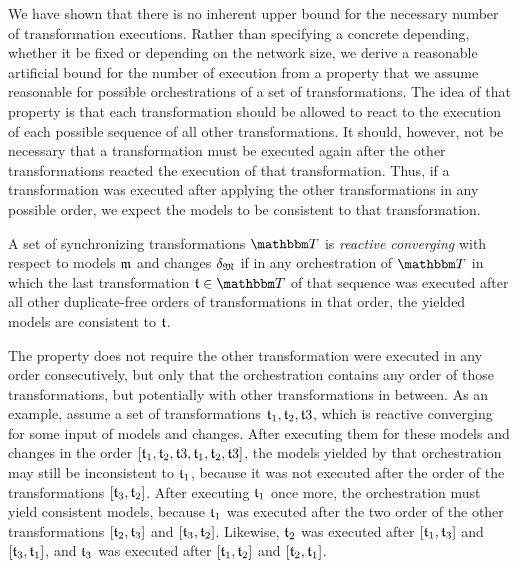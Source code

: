 We have shown that there is no inherent upper bound for the necessary number of transformation executions.
Rather than specifying a concrete depending, whether it be fixed or depending on the network size, we derive a reasonable artificial bound for the number of execution from a property that we assume reasonable for possible orchestrations of a set of transformations.
The idea of that property is that each transformation should be allowed to react to the execution of each possible sequence of all other transformations.
It should, however, not be necessary that a transformation must be executed again after the other transformations reacted the execution of that transformation.
Thus, if a transformation was executed after applying the other transformations in any possible order, we expect the models to be consistent to that transformation.

\begin{definition}
    \label{def:reactiveconverging}
    A set of synchronizing transformations $\transformationset{T}$ is \emph{reactive converging} with respect to models $\mathfrak{m}$ and changes $\mathfrak{\delta}_{\mathfrak{M}}$ if in any orchestration of $\transformationset{T}$ in which the last transformation $\transformation{t} \in \transformationset{T}$ of that sequence was executed after all other duplicate-free orders of transformations in that order, the yielded models are consistent to $\mathfrak{t}$.
\end{definition}

The property does not require the other transformation were executed in any order consecutively, but only that the orchestration contains any order of those transformations, but potentially with other transformations in between.
As an example, assume a set of transformations $\mathfrak{t}_{1}, \mathfrak{t}_{2}, \mathfrak{t}{3}$, which is reactive converging for some input of models and changes.
After executing them for these models and changes in the order $[\mathfrak{t}_{1}, \mathfrak{t}_{2}, \mathfrak{t}{3}, \mathfrak{t}_{1}, \mathfrak{t}_{2}, \mathfrak{t}{3}]$, the models yielded by that orchestration may still be inconsistent to $\mathfrak{t}_{1}$, because it was not executed after the order of the transformations $[\mathfrak{t}_{3}, \mathfrak{t}_{2}]$.
After executing $\mathfrak{t}_{1}$ once more, the orchestration must yield consistent models, because $\mathfrak{t}_{1}$ was executed after the two order of the other transformations $[\mathfrak{t}_{2}, \mathfrak{t}_{3}]$ and $[\mathfrak{t}_{3}, \mathfrak{t}_{2}]$.
Likewise, $\mathfrak{t}_{2}$ was executed after $[\mathfrak{t}_{1}, \mathfrak{t}_{3}]$ and $[\mathfrak{t}_{3}, \mathfrak{t}_{1}]$, and $\mathfrak{t}_{3}$ was executed after $[\mathfrak{t}_{1}, \mathfrak{t}_{2}]$ and $[\mathfrak{t}_{2}, \mathfrak{t}_{1}]$.


